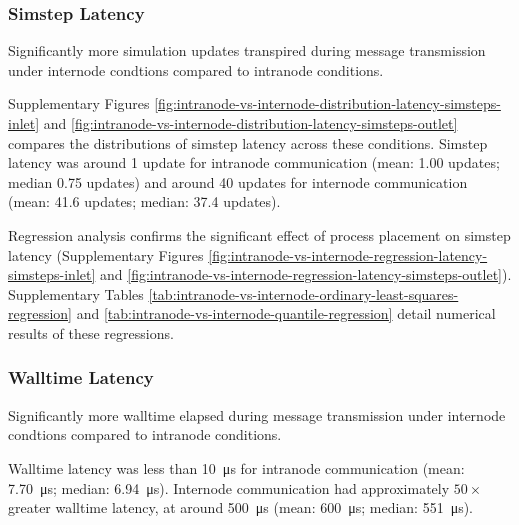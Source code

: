 \subsubsection{Simstep Latency}

Significantly more simulation updates transpired during message transmission under internode condtions compared to intranode conditions.

Supplementary Figures \ref{fig:intranode-vs-internode-distribution-latency-simsteps-inlet} and \ref{fig:intranode-vs-internode-distribution-latency-simsteps-outlet} compares the distributions of simstep latency across these conditions.
Simstep latency was around 1 update for intranode communication (mean: 1.00 updates; median 0.75 updates) and around 40 updates for internode communication (mean: 41.6 updates; median: 37.4 updates).

Regression analysis confirms the significant effect of process placement on simstep latency (Supplementary Figures \ref{fig:intranode-vs-internode-regression-latency-simsteps-inlet} and \ref{fig:intranode-vs-internode-regression-latency-simsteps-outlet}).
Supplementary Tables \ref{tab:intranode-vs-internode-ordinary-least-squares-regression} and \ref{tab:intranode-vs-internode-quantile-regression} detail numerical results of these regressions.

\subsubsection{Walltime Latency}

Significantly more walltime elapsed during message transmission under internode condtions compared to intranode conditions.

Walltime latency was less than \SI{10}{\micro\second} for intranode communication (mean: \SI{7.70}{\micro\second}; median: \SI{6.94}{\micro\second}).
Internode communication had approximately $50\times$ greater walltime latency, at around \SI{500}{\micro\second} (mean: \SI{600}{\micro\second}; median: \SI{551}{\micro\second}).

